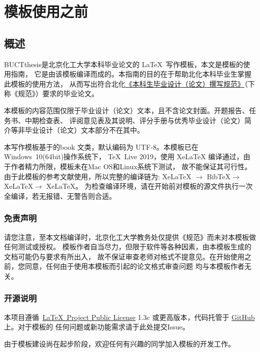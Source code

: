 \chapter{模板使用之前}
\section{概述}
BUCTthesis是北京化工大学本科毕业论文的 \LaTeX\ 写作模板，本文是模板的使用指南，
它是由该模板编译而成的。本指南的目的在于帮助北化本科毕业生掌握此模板的使用方法，
从而写出符合北化\href{https://jiaowuchu.buct.edu.cn/2018/1009/c515a22046/page.htm}%
{《本科生毕业设计（论文）撰写规范》}（下称《规范》）要求的毕业论文。

本模板的内容范围仅限于毕业设计（论文）文本，且不含论文封面。开题报告、任务书、中期检查表、
评阅意见表及其说明、评分手册与优秀毕业设计（论文）简介等非毕业设计（论文）文本部分不在其中。

本写作模板基于\CTeX{}的book 文类，默认编码为 UTF-8。本模板已在Windows\ 10(64bit)操作系统下，
\TeX\ Live 2019，使用 XeLaTeX 编译通过，由于作者精力所限，模板未在Mac OS和Linux系统下测试，
故不能保证其可行性。由于此模板的参考文献使用\BibTeX{}，所以完整的编译链为:
XeLaTeX $\rightarrow$ BibTeX{}$\rightarrow$ XeLaTeX{}$\rightarrow$ XeLaTeX{}。
为检查编译环境，请在开始前对模板的源文件执行一次全编译，若无报错、无警告则合适。

\subsection{免责声明}
请您注意，至本文档编译时，北京化工大学教务处仅提供《规范》而未对本模板做任何测试或授权。
模板作者自当尽力，但限于软件等各种因素，由本模板生成的文档可能仍与要求有所出入，
故不保证审查老师对格式不提意见。在开始使用之前，您同意，任何由于使用本模板而引起的论文格式审查问题
均与本模板作者无关。

\subsection{开源说明}
本项目遵循~\href{https://www.latex-project.org/lppl.txt}{\LaTeX\ Project Public License} 1.3c
或更高版本，代码托管于 \href{https://github.com/Miracle0565/BUCTthesis}{GitHub} 上。对于模板的
任何问题或新功能需求请于此处提交Issue。

由于模板建设尚在起步阶段，欢迎任何有兴趣的同学加入模板的开发工作。

